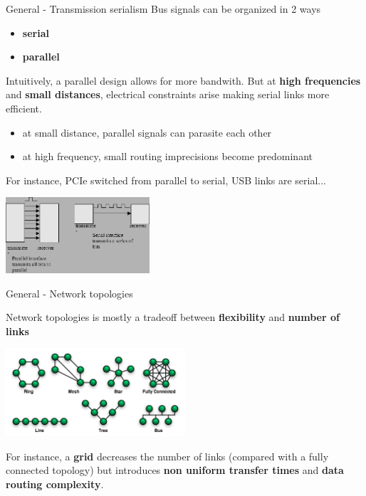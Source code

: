 \begin{frame}{General - Transmission serialism}
  Bus signals can be organized in 2 ways
  \begin{itemize}
  \item \textbf{serial}
  \item \textbf{parallel}
  \end{itemize}

  \smallskip
  Intuitively, a parallel design allows for more bandwith. But at \textbf{high frequencies} and
  \textbf{small distances}, electrical constraints arise making serial links more efficient.
  \begin{itemize}
  \item at small distance, parallel signals can parasite each other
  \item at high frequency, small routing imprecisions become predominant
  \end{itemize}

  \smallskip
  For instance, PCIe switched from parallel to serial, USB links are serial...

  \smallskip
  \begin{center}
    \includegraphics[width=0.4\textwidth]{figures/serial_parallel.png}
  \end{center}

\end{frame}

\begin{frame}{General - Network topologies}

  Network topologies is mostly a tradeoff between \textbf{flexibility} and \textbf{number of links}

  \smallskip
  \begin{center}
    \includegraphics[width=0.5\textwidth]{figures/network_topo.png}
  \end{center}

  For instance, a \textbf{grid} decreases the number of links (compared with a fully connected topology)
  but introduces \textbf{non uniform transfer times} and \textbf{data routing complexity}.

\end{frame}

